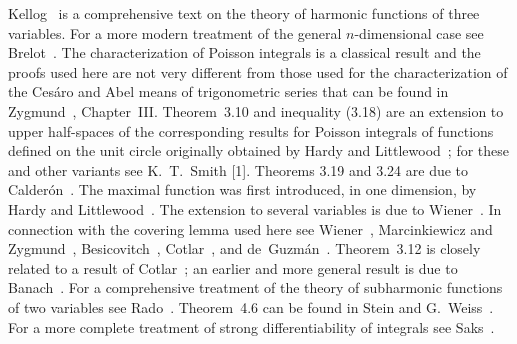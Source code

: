 \bibnoteshead

Kellog~\cite{Kellog1} is a comprehensive text on the theory of harmonic functions of three variables. For a more modern treatment of the general $n$-dimensional case see Brelot~\cite{Brelot1}. The characterization of Poisson integrals is a classical result and the proofs used here are not very different from those used for the characterization of the Ces\'aro and Abel means of trigonometric series that can be found in Zygmund~\cite{Zygmund1}, Chapter~III. Theorem~3.10 and inequality (3.18) are an extension to upper half-spaces of the corresponding results for Poisson integrals of functions defined on the unit circle originally obtained by Hardy and Littlewood~\cite{HardyLittlewood1}; for these and other variants see K.~T.~Smith [1].%
Theorems 3.19 and 3.24 are due to Calder\'on~\cite{Calderon1}. The maximal function was first introduced, in one dimension, by Hardy and Littlewood~\cite{HardyLittlewood1}. The extension to several variables is due to Wiener~\cite{Wiener2}. In connection with the covering lemma used here see Wiener~\cite{Wiener2}, Marcinkiewicz and Zygmund~\cite{MarcinkiewiczZygmund1}, Besicovitch~\cite{Besicovitch2}, Cotlar~\cite{Cotlar1}, and de~Guzm\'an~\cite{deGuzman1}. Theorem~3.12 is closely related to a result of Cotlar~\cite{Cotlar1}; an earlier and more general result is due to Banach~\cite{Banach1}. For a comprehensive treatment of the theory of subharmonic functions of two variables see Rado~\cite{Rado1}. Theorem~4.6 can be found in Stein and G.~Weiss~\cite{SteinWeiss1}. For a more complete treatment of strong differentiability of integrals see Saks~\cite{Saks1}.
